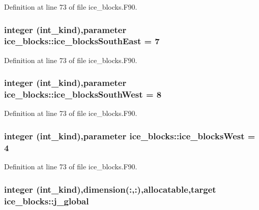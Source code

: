 Definition at line 73 of file ice\_\-blocks.F90.\hypertarget{namespaceice__blocks_a9b754927f41986abc5c81c88b55a4975}{
\subsubsection[{ice\_\-blocksSouthEast}]{\setlength{\rightskip}{0pt plus 5cm}integer (int\_\-kind),parameter {\bf ice\_\-blocks::ice\_\-blocksSouthEast} = 7}}
\label{namespaceice__blocks_a9b754927f41986abc5c81c88b55a4975}


Definition at line 73 of file ice\_\-blocks.F90.\hypertarget{namespaceice__blocks_a8199fdd4814a3c9865a3323bf4a484a6}{
\subsubsection[{ice\_\-blocksSouthWest}]{\setlength{\rightskip}{0pt plus 5cm}integer (int\_\-kind),parameter {\bf ice\_\-blocks::ice\_\-blocksSouthWest} = 8}}
\label{namespaceice__blocks_a8199fdd4814a3c9865a3323bf4a484a6}


Definition at line 73 of file ice\_\-blocks.F90.\hypertarget{namespaceice__blocks_a19582ab3df93a40ccf948e06353de278}{
\subsubsection[{ice\_\-blocksWest}]{\setlength{\rightskip}{0pt plus 5cm}integer (int\_\-kind),parameter {\bf ice\_\-blocks::ice\_\-blocksWest} = 4}}
\label{namespaceice__blocks_a19582ab3df93a40ccf948e06353de278}


Definition at line 73 of file ice\_\-blocks.F90.\hypertarget{namespaceice__blocks_aabcbed07b689eed9c35b22f738006217}{
\subsubsection[{j\_\-global}]{\setlength{\rightskip}{0pt plus 5cm}integer (int\_\-kind),dimension(:,:),allocatable,target {\bf ice\_\-blocks::j\_\-global}}}
\label{namespaceice__blocks_aabcbed07b689eed9c35b22f738006217}


